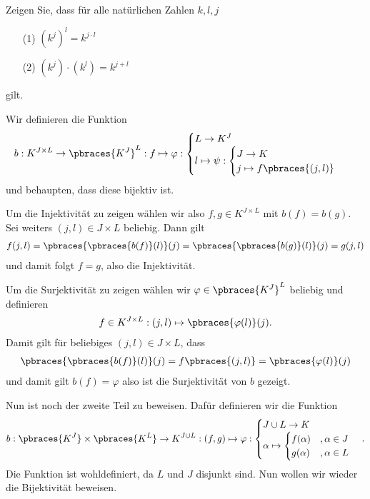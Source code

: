 \begin{exercise}
    Zeigen Sie, dass für alle natürlichen Zahlen $k,l,j$
    \begin{itemize}
        \item[(1)] $(k^j)^l = k^{j \cdot l}$
        \item[(2)] $(k^j) \cdot (k^l) = k^{j + l}$
    \end{itemize}
    gilt.
\end{exercise}

\begin{solution}
    Wir definieren die Funktion
    \begin{align*}
        b: K^{J \times L} \to \pbraces{K^J}^L : f \mapsto \varphi:
        \begin{cases}
            L \to K^J \\
            l \mapsto \psi:
            \begin{cases}
                J \to K \\
                j \mapsto f\pbraces{(j,l)}
            \end{cases}
        \end{cases}
    \end{align*}
    und behaupten, dass diese bijektiv ist.

    Um die Injektivität zu zeigen wählen wir also $f,g \in K^{J \times L}$ mit $b(f) = b(g)$. Sei weiters $(j,l) \in J \times L$ beliebig. Dann gilt
    \begin{align*}
        f(j,l) = \pbraces{ \pbraces{b(f) }(l) }(j) = \pbraces{ \pbraces{b(g) }(l) }(j) = g(j,l)
    \end{align*}
    und damit folgt $f = g$, also die Injektivität.

    Um die Surjektivität zu zeigen wählen wir $\varphi \in \pbraces{K^J}^L$ beliebig und definieren
    \begin{align*}
        f \in K^{J \times L}: (j, l) \mapsto \pbraces{\varphi(l)}(j).
    \end{align*}
    Damit gilt für beliebiges $(j,l) \in J \times L$, dass
    \begin{align*}
        \pbraces{\pbraces{b(f) }(l) }(j) = f\pbraces{(j,l)} = \pbraces{\varphi(l)}(j)
    \end{align*}
    und damit gilt $b(f) = \varphi$ also ist die Surjektivität von $b$ gezeigt.

    Nun ist noch der zweite Teil zu beweisen. Dafür definieren wir die Funktion
    \begin{align*}
        b: \pbraces{K^J} \times \pbraces{K^L} \to K^{J \cup L}: (f,g) \mapsto \varphi:
        \begin{cases}
            J \cup L \to K \\
            \alpha \mapsto
            \begin{cases}
                f(\alpha) &, \alpha \in J \\
                g(\alpha) &, \alpha \in L
            \end{cases}
        \end{cases} .
    \end{align*}
    Die Funktion ist wohldefiniert, da $L$ und $J$ disjunkt sind. Nun wollen wir wieder die Bijektivität beweisen.


\end{solution}
